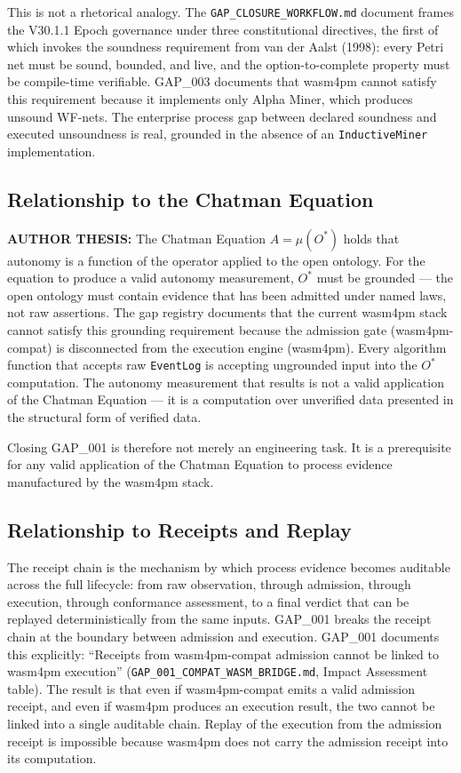 This is not a rhetorical analogy. The \texttt{GAP\_CLOSURE\_WORKFLOW.md} document
frames the V30.1.1 Epoch governance under three constitutional directives, the first
of which invokes the soundness requirement from van der Aalst (1998): every Petri net
must be sound, bounded, and live, and the option-to-complete property must be
compile-time verifiable. GAP\_003 documents that wasm4pm cannot satisfy this requirement
because it implements only Alpha Miner, which produces unsound WF-nets. The enterprise
process gap between declared soundness and executed unsoundness is real, grounded in
the absence of an \texttt{InductiveMiner} implementation.

\subsection{Relationship to the Chatman Equation}
\label{sec:gaps-lineage-chatman-equation}

\textbf{AUTHOR THESIS:} The Chatman Equation $A = \mu(O^*)$ holds that autonomy is a
function of the operator applied to the open ontology. For the equation to produce a
valid autonomy measurement, $O^*$ must be grounded — the open ontology must contain
evidence that has been admitted under named laws, not raw assertions. The gap registry
documents that the current wasm4pm stack cannot satisfy this grounding requirement
because the admission gate (wasm4pm-compat) is disconnected from the execution engine
(wasm4pm). Every algorithm function that accepts raw \texttt{EventLog} is accepting
ungrounded input into the $O^*$ computation. The autonomy measurement that results is
not a valid application of the Chatman Equation — it is a computation over unverified
data presented in the structural form of verified data.

Closing GAP\_001 is therefore not merely an engineering task. It is a prerequisite for
any valid application of the Chatman Equation to process evidence manufactured by the
wasm4pm stack.

\subsection{Relationship to Receipts and Replay}
\label{sec:gaps-lineage-receipts}

The receipt chain is the mechanism by which process evidence becomes auditable across
the full lifecycle: from raw observation, through admission, through execution, through
conformance assessment, to a final verdict that can be replayed deterministically from
the same inputs. GAP\_001 breaks the receipt chain at the boundary between admission
and execution. GAP\_001 documents this explicitly: ``Receipts from wasm4pm-compat
admission cannot be linked to wasm4pm execution'' (\texttt{GAP\_001\_COMPAT\_WASM\_BRIDGE.md},
Impact Assessment table). The result is that even if wasm4pm-compat emits a valid
admission receipt, and even if wasm4pm produces an execution result, the two cannot be
linked into a single auditable chain. Replay of the execution from the admission receipt
is impossible because wasm4pm does not carry the admission receipt into its computation.

